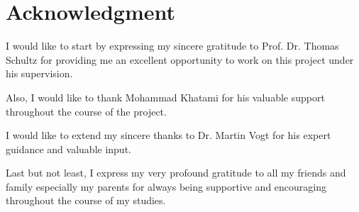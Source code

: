 \documentclass[../structure.tex]{subfiles}
\begin{document}
\chapter*{Acknowledgment}

\quad I would like to start by expressing my sincere gratitude to Prof. Dr. Thomas Schultz 
for providing me an excellent opportunity to work on this project under his supervision.

Also, I would like to thank Mohammad Khatami for his valuable support throughout the course of the project.

I would like to extend my sincere thanks to Dr. Martin Vogt for his expert guidance and valuable input.

Last but not least, I express my very profound gratitude to all my friends
and family especially my parents for always being supportive and encouraging throughout the course of my studies.

\end{document}
